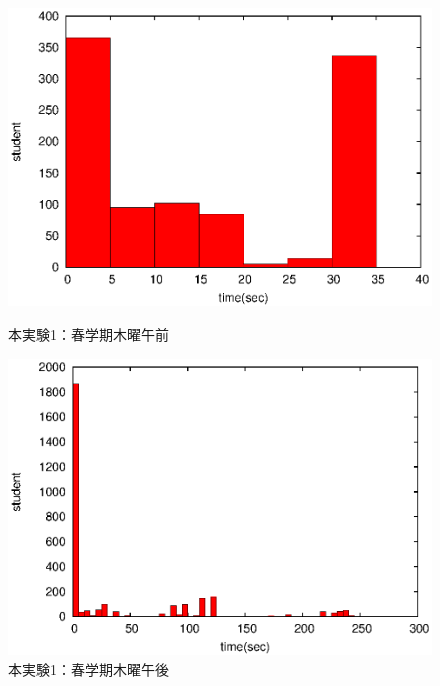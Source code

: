 \documentclass[a4paper,10pt]{jarticle}
\begin{document}
\begin{figure}[htpb]                        
\begin{minipage} {0.5\hsize}                             
\begin{center}                              
\includegraphics[bb=0 0 390 248,clip,width=\hsize]{oTh12_hist.eps}   
\caption{本実験1：春学期木曜午前}                              
\label{oTh12}                                
\end{center}                                    
\end{minipage}                                 
\begin{minipage}{0.5\hsize}                                            
\begin{center}                              
\includegraphics[bb=0 0 390 248,clip,width=\hsize]{oTh345_hist.eps}   
\caption{本実験1：春学期木曜午後}                              
\label{oTh345}                                
\end{center}                                    
\end{minipage}                                 
\end{figure}                                 
\end{document}

